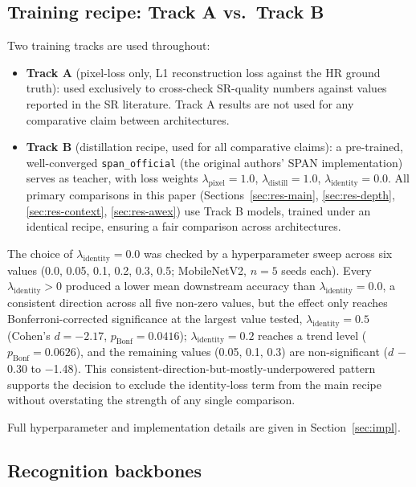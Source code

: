 \documentclass[11pt]{article}
\begin{document}
\subsection{Training recipe: Track A vs.\ Track B}
\label{sec:recipe}

Two training tracks are used throughout:

\begin{itemize}
\item \textbf{Track A} (pixel-loss only, L1 reconstruction loss against the HR ground truth): used exclusively to cross-check SR-quality numbers against values reported in the SR literature. Track A results are not used for any comparative claim between architectures.
\item \textbf{Track B} (distillation recipe, used for all comparative claims): a pre-trained, well-converged \texttt{span\_official} (the original authors' SPAN implementation) serves as teacher, with loss weights $\lambda_{\text{pixel}}=1.0$, $\lambda_{\text{distill}}=1.0$, $\lambda_{\text{identity}}=0.0$. All primary comparisons in this paper (Sections~\ref{sec:res-main}, \ref{sec:res-depth}, \ref{sec:res-context}, \ref{sec:res-awex}) use Track B models, trained under an identical recipe, ensuring a fair comparison across architectures.
\end{itemize}

The choice of $\lambda_{\text{identity}}=0.0$ was checked by a hyperparameter sweep across six values (0.0, 0.05, 0.1, 0.2, 0.3, 0.5; MobileNetV2, $n=5$ seeds each). Every $\lambda_{\text{identity}}>0$ produced a lower mean downstream accuracy than $\lambda_{\text{identity}}=0.0$, a consistent direction across all five non-zero values, but the effect only reaches Bonferroni-corrected significance at the largest value tested, $\lambda_{\text{identity}}=0.5$ (Cohen's $d=-2.17$, $p_{\text{Bonf}}=0.0416$); $\lambda_{\text{identity}}=0.2$ reaches a trend level ($p_{\text{Bonf}}=0.0626$), and the remaining values (0.05, 0.1, 0.3) are non-significant ($d$ $-$0.30 to $-$1.48). This consistent-direction-but-mostly-underpowered pattern supports the decision to exclude the identity-loss term from the main recipe without overstating the strength of any single comparison.

Full hyperparameter and implementation details are given in Section~\ref{sec:impl}.

\subsection{Recognition backbones}
\end{document}
